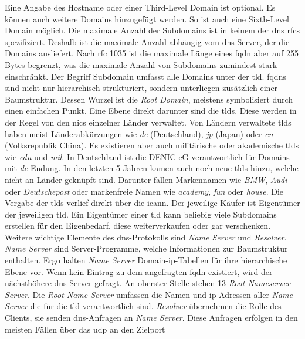 \documentclass[titlepage]{report}
\begin{document}
Eine Angabe des Hostname oder einer Third-Level
Domain ist optional. Es können auch weitere Domains hinzugefügt werden.
So ist auch eine Sixth-Level Domain möglich. Die maximale Anzahl der
Subdomains ist in keinem der \gls{dns} \glspl{rfc} spezifiziert. Deshalb
ist die maximale Anzahl abhängig vom \gls{dns}\hyp{}Server, der die
Domains ausliefert. Nach \gls{rfc} 1035 ist die maximale Länge eines
\gls{fqdn} aber auf 255 Bytes begrenzt\cite[siehe Section
2.3.4]{RFC1035}, was die maximale Anzahl von Subdomains zumindest stark
einschränkt. Der Begriff Subdomain umfasst alle Domains unter der
\gls{tld}. \glspl{fqdn} sind nicht nur hierarchisch strukturiert, sondern
unterliegen zusätzlich einer Baumstruktur. Dessen Wurzel ist die
\emph{Root Domain}, meistens symbolisiert durch einen einfachen Punkt.
Eine Ebene direkt darunter sind die \glspl{tld}. Diese
werden in der Regel von den \glspl{nic} einzelner Länder verwaltet. Von
Ländern verwaltete \glspl{tld} haben meist Länderabkürzungen wie
\emph{de} (Deutschland), \emph{jp} (Japan) oder \emph{cn} (Volksrepublik
China). Es existieren aber auch militärische oder akademische
\glspl{tld} wie \emph{edu} und \emph{mil}. In Deutschland ist die DENIC eG
verantwortlich für Domains mit \emph{de}\hyp{}Endung.
In den letzten 5 Jahren kamen auch noch neue \glspl{tld} hinzu, welche
nicht an Länder geknüpft sind. Darunter fallen Markennamen wie
\emph{BMW}, \emph{Audi} oder \emph{Deutschepost} oder markenfreie Namen
wie \emph{academy}, \emph{fun} oder \emph{house}\cite{NEWTLDLIST}. Die
Vergabe der \glspl{tld} verlief direkt über die \gls{icann}. Der jeweilige
Käufer ist Eigentümer der jeweiligen \gls{tld}. Ein Eigentümer
einer \gls{tld} kann beliebig viele Subdomains erstellen für den
Eigenbedarf, diese weiterverkaufen oder gar verschenken. Weitere
wichtige Elemente des \gls{dns}\hyp{}Protokolls sind \emph{Name Server}
und \emph{Resolver}\cite[siehe Section 2.4]{RFC1034}.
\emph{Name Server} sind Server\hyp{}Programme, welche
Informationen zur Baumstruktur enthalten. Ergo halten \emph{Name
Server} Domain\hyp{}\gls{ip}\hyp{}Tabellen für ihre
hierarchische Ebene vor. Wenn kein Eintrag zu dem angefragten \gls{fqdn}
existiert, wird der nächsthöhere \gls{dns}\hyp{}Server gefragt. An
oberster Stelle stehen 13 \emph{Root Nameserver
Server}\cite{ROOTNAMESERVER}. Die \emph{Root
Name Server} umfassen die Namen und \gls{ip}\hyp{}Adressen aller
\emph{Name Server} die für die \gls{tld} verantwortlich sind.
\emph{Resolver} übernehmen die Rolle des Clients, sie senden
\gls{dns}\hyp{}Anfragen an \emph{Name Server}. Diese
Anfragen erfolgen in den meisten Fällen über das \gls{udp} an den Zielport
\end{document}

